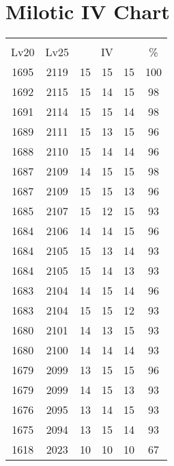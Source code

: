 \documentclass{article}%
\begin{document}
%
\normalsize%
\section{Milotic IV Chart}%
\label{sec:Milotic IV Chart}%
\renewcommand{\arraystretch}{1.5}%
\begin{tabular}{|c|c|c|c|c|c|}%
\hline%
\multicolumn{6}{|c|}{\textcolor{white}{ 
\linebreak{Milotic}
}%
\cellcolor{black}}\\%
\multicolumn{1}{|c}{Lv20}&\multicolumn{1}{c|}{Lv25}&\multicolumn{3}{c|}{IV}&\multicolumn{1}{|c|}{\%}\\%
\hline%
\rowcolor{color100}%
1695&2119&15&15&15&100\\%
\hline%
\rowcolor{color98}%
1692&2115&15&14&15&98\\%
\hline%
\rowcolor{color98}%
1691&2114&15&15&14&98\\%
\hline%
\rowcolor{color96}%
1689&2111&15&13&15&96\\%
\hline%
\rowcolor{color96}%
1688&2110&15&14&14&96\\%
\hline%
\rowcolor{color98}%
1687&2109&14&15&15&98\\%
\hline%
\rowcolor{color96}%
1687&2109&15&15&13&96\\%
\hline%
\rowcolor{color93}%
1685&2107&15&12&15&93\\%
\hline%
\rowcolor{color96}%
1684&2106&14&14&15&96\\%
\hline%
\rowcolor{color93}%
1684&2105&15&13&14&93\\%
\hline%
\rowcolor{color93}%
1684&2105&15&14&13&93\\%
\hline%
\rowcolor{color96}%
1683&2104&14&15&14&96\\%
\hline%
\rowcolor{color93}%
1683&2104&15&15&12&93\\%
\hline%
\rowcolor{color93}%
1680&2101&14&13&15&93\\%
\hline%
\rowcolor{color93}%
1680&2100&14&14&14&93\\%
\hline%
\rowcolor{color96}%
1679&2099&13&15&15&96\\%
\hline%
\rowcolor{color93}%
1679&2099&14&15&13&93\\%
\hline%
\rowcolor{color93}%
1676&2095&13&14&15&93\\%
\hline%
\rowcolor{color93}%
1675&2094&13&15&14&93\\%
\hline%
\rowcolor{color91}%
1618&2023&10&10&10&67\\%
\end{tabular}

%
\end{document}
